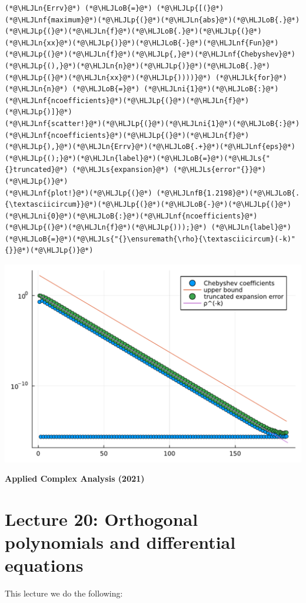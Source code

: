 \documentclass[12pt,a4paper]{article}
\newcommand{\HLJLk}[1]{\textcolor[RGB]{148,91,176}{\textbf{#1}}}
\newcommand{\HLJLn}[1]{#1}
\newcommand{\HLJLnf}[1]{\textcolor[RGB]{66,102,213}{#1}}
\newcommand{\HLJLs}[1]{\textcolor[RGB]{201,61,57}{#1}}
\newcommand{\HLJLnfB}[1]{\textcolor[RGB]{59,151,46}{#1}}
\newcommand{\HLJLni}[1]{\textcolor[RGB]{59,151,46}{#1}}
\newcommand{\HLJLoB}[1]{\textcolor[RGB]{102,102,102}{\textbf{#1}}}
\newcommand{\HLJLp}[1]{#1}
\begin{document}
\begin{lstlisting}
(*@\HLJLn{Errv}@*) (*@\HLJLoB{=}@*) (*@\HLJLp{[(}@*)(*@\HLJLnf{maximum}@*)(*@\HLJLp{(}@*)(*@\HLJLn{abs}@*)(*@\HLJLoB{.}@*)(*@\HLJLp{(}@*)(*@\HLJLn{f}@*)(*@\HLJLoB{.}@*)(*@\HLJLp{(}@*)(*@\HLJLn{xx}@*)(*@\HLJLp{)}@*)(*@\HLJLoB{-}@*)(*@\HLJLnf{Fun}@*)(*@\HLJLp{(}@*)(*@\HLJLn{f}@*)(*@\HLJLp{,}@*)(*@\HLJLnf{Chebyshev}@*)(*@\HLJLp{(),}@*)(*@\HLJLn{n}@*)(*@\HLJLp{)}@*)(*@\HLJLoB{.}@*)(*@\HLJLp{(}@*)(*@\HLJLn{xx}@*)(*@\HLJLp{))))}@*) (*@\HLJLk{for}@*) (*@\HLJLn{n}@*) (*@\HLJLoB{=}@*) (*@\HLJLni{1}@*)(*@\HLJLoB{:}@*)(*@\HLJLnf{ncoefficients}@*)(*@\HLJLp{(}@*)(*@\HLJLn{f}@*)(*@\HLJLp{)]}@*)
(*@\HLJLnf{scatter!}@*)(*@\HLJLp{(}@*)(*@\HLJLni{1}@*)(*@\HLJLoB{:}@*)(*@\HLJLnf{ncoefficients}@*)(*@\HLJLp{(}@*)(*@\HLJLn{f}@*)(*@\HLJLp{),}@*)(*@\HLJLn{Errv}@*)(*@\HLJLoB{.+}@*)(*@\HLJLnf{eps}@*)(*@\HLJLp{();}@*)(*@\HLJLn{label}@*)(*@\HLJLoB{=}@*)(*@\HLJLs{"{}truncated}@*) (*@\HLJLs{expansion}@*) (*@\HLJLs{error"{}}@*)(*@\HLJLp{)}@*)
(*@\HLJLnf{plot!}@*)(*@\HLJLp{(}@*) (*@\HLJLnfB{1.2198}@*)(*@\HLJLoB{.{\textasciicircum}}@*)(*@\HLJLp{(}@*)(*@\HLJLoB{-}@*)(*@\HLJLp{(}@*)(*@\HLJLni{0}@*)(*@\HLJLoB{:}@*)(*@\HLJLnf{ncoefficients}@*)(*@\HLJLp{(}@*)(*@\HLJLn{f}@*)(*@\HLJLp{)));}@*) (*@\HLJLn{label}@*)(*@\HLJLoB{=}@*)(*@\HLJLs{"{}\ensuremath{\rho}{\textasciicircum}(-k)"{}}@*)(*@\HLJLp{)}@*)
\end{lstlisting}

\includegraphics[width=\linewidth]{jl_hpkPoK/OP_methods_test_28_1.pdf}

\textbf{Applied Complex Analysis (2021)}

\section{Lecture 20: Orthogonal polynomials and differential equations}
This lecture we do the following:
\end{document}
